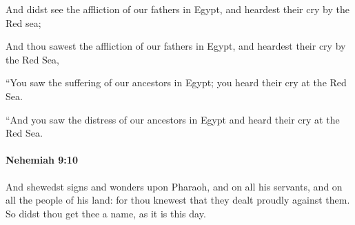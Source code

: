 			And didst see the affliction of our fathers in Egypt, and heardest their cry by the Red sea;

			\begin{versebox}
					\item[BHS] 
					\item[LXX] 
					\item[ASV] And thou sawest the affliction of our fathers in Egypt, and heardest their cry by the Red Sea,
					\item[NIV] “You saw the suffering of our ancestors in Egypt; you heard their cry at the Red Sea.
					\item[NRSV] “And you saw the distress of our ancestors in Egypt and heard their cry at the Red Sea.
			\end{versebox}

		\paragraph{Nehemiah 9:10} %
			\label{NEHEMIAH-9-10}

			And shewedst signs and wonders upon Pharaoh, and on all his servants, and on all the people of his land: for thou knewest that they dealt proudly against them. So didst thou get thee a name, as it is this day.

